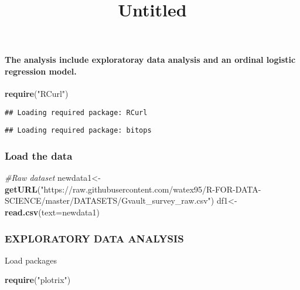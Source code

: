\documentclass[]{article}
\title{Untitled}
\author{}
\date{\vspace{-2.5em}}
\newenvironment{Shaded}{\begin{snugshade}}{\end{snugshade}}
\newcommand{\KeywordTok}[1]{\textcolor[rgb]{0.13,0.29,0.53}{\textbf{#1}}}
\newcommand{\DataTypeTok}[1]{\textcolor[rgb]{0.13,0.29,0.53}{#1}}
\newcommand{\StringTok}[1]{\textcolor[rgb]{0.31,0.60,0.02}{#1}}
\newcommand{\CommentTok}[1]{\textcolor[rgb]{0.56,0.35,0.01}{\textit{#1}}}
\newcommand{\NormalTok}[1]{#1}
\let\oldparagraph\paragraph
\renewcommand{\paragraph}[1]{\oldparagraph{#1}\mbox{}}
\begin{document}
\maketitle

\paragraph{The analysis include exploratoray data analysis and an
ordinal logistic regression
model.}\label{the-analysis-include-exploratoray-data-analysis-and-an-ordinal-logistic-regression-model.}

\begin{Shaded}
\begin{Highlighting}[]
\KeywordTok{require}\NormalTok{(}\StringTok{"RCurl"}\NormalTok{)}
\end{Highlighting}
\end{Shaded}

\begin{verbatim}
## Loading required package: RCurl
\end{verbatim}

\begin{verbatim}
## Loading required package: bitops
\end{verbatim}

\subsubsection{Load the data}\label{load-the-data}

\begin{Shaded}
\begin{Highlighting}[]
\CommentTok{#Raw dataset}
\NormalTok{newdata1<-}\KeywordTok{getURL}\NormalTok{(}\StringTok{"https://raw.githubusercontent.com/watex95/R-FOR-DATA-SCIENCE/master/DATASETS/Gvault_survey_raw.csv"}\NormalTok{)}
\NormalTok{df1<-}\KeywordTok{read.csv}\NormalTok{(}\DataTypeTok{text=}\NormalTok{newdata1)}
\end{Highlighting}
\end{Shaded}

\subsubsection{EXPLORATORY DATA
ANALYSIS}\label{exploratory-data-analysis}

Load packages

\begin{Shaded}
\begin{Highlighting}[]
\KeywordTok{require}\NormalTok{(}\StringTok{"plotrix"}\NormalTok{)}
\end{Highlighting}
\end{Shaded}
\end{document}
